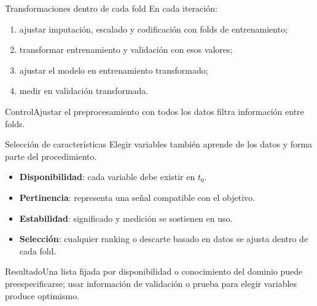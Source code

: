 \documentclass[aspectratio=169,10pt]{beamer}
\newcommand{\concepto}[1]{\textcolor{UAPTeal}{\textbf{#1}}}
\newcommand{\br}{\\}
\begin{document}
\begin{frame}{Transformaciones dentro de cada fold}
  \small En cada iteración:
  \begin{enumerate}
    \item ajustar imputación, escalado y codificación con folds de entrenamiento;
    \item transformar entrenamiento y validación con esos valores;
    \item ajustar el modelo en entrenamiento transformado;
    \item medir en validación transformada.
  \end{enumerate}
  \begin{center}\end{center}
  \begin{alertblock}{Control}Ajustar el preprocesamiento con todos los datos filtra información entre folds.\end{alertblock}
\end{frame}

\begin{frame}{Selección de características}
  \small Elegir variables también aprende de los datos y forma parte del procedimiento.
  \begin{itemize}
    \item \concepto{Disponibilidad}: cada variable debe existir en $t_0$.
    \item \concepto{Pertinencia}: representa una señal compatible con el objetivo.
    \item \concepto{Estabilidad}: significado y medición se sostienen en uso.
    \item \concepto{Selección}: cualquier ranking o descarte basado en datos se ajusta dentro de cada fold.
  \end{itemize}
  \begin{block}{Resultado}Una lista fijada por disponibilidad o conocimiento del dominio puede preespecificarse; usar información de validación o prueba para elegir variables produce optimismo.\end{block}
\end{frame}
\end{document}
